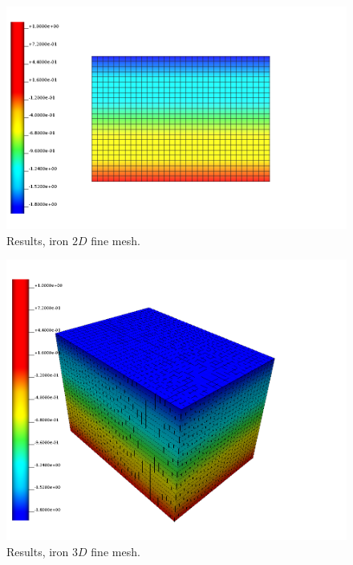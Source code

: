 %
\begin{figure}[h!]
    \centering 
    \includegraphics[width=0.9\columnwidth]{examples/example-0101/doc/figures/l160x120x000_n32x24x00_i1_s0.png} 
    \caption{Results, iron $2D$ fine mesh.}
    \label{example-0101-iron-2D-fig}
\end{figure}
%
\begin{figure}[h!]
    \centering 
    \includegraphics[width=0.9\columnwidth]{examples/example-0101/doc/figures/l160x120x120_n32x24x24_i1_s0.png} 
    \caption{Results, iron $3D$ fine mesh.}
    \label{example-0101-iron-3D-fig}
\end{figure}
